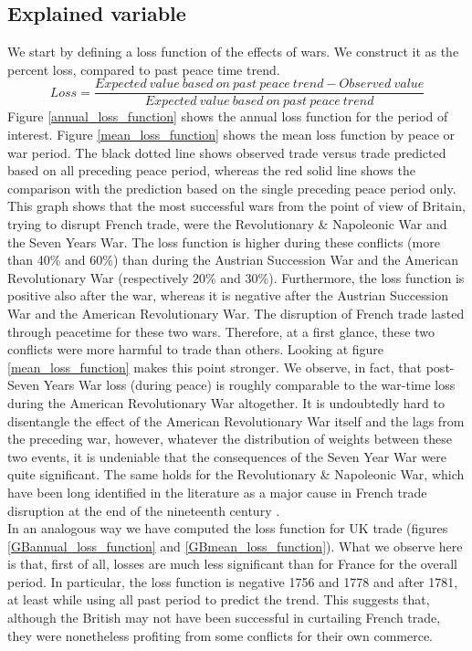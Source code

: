 \documentclass[12pt,a4paper,notitlepage,english]{article}
\begin{document}
\subsection{Explained variable}
We start by defining a loss function of the effects of wars.
We construct it as the percent loss, compared to past peace time trend.
\begin{equation*}
Loss = \frac{Expected \> value \> based \> on \>past \> peace \>trend - Observed \> value}{Expected \> value \> based \> on \>past \> peace \>trend}
\end{equation*}
Figure \ref{annual_loss_function} shows the annual loss function for the period of interest. Figure \ref{mean_loss_function} shows the mean loss function by peace or war period.
The black dotted line shows observed trade versus trade predicted based on all preceding peace period, whereas the red solid line shows the comparison with the prediction based on the single preceding peace period only.
This graph shows that the most successful wars from the point of view of Britain, trying to disrupt French trade, were the Revolutionary \& Napoleonic War and the Seven Years War.
The loss function is higher during these conflicts (more than 40\% and 60\%) than during the Austrian Succession War and the American Revolutionary War (respectively 20\% and 30\%).
Furthermore, the loss function is positive also after the war, whereas it is negative after the Austrian Succession War and the American Revolutionary War. The disruption of French trade lasted through peacetime for these two wars. 
Therefore, at a first glance, these two conflicts were more harmful to trade than others.
Looking at figure \ref{mean_loss_function} makes this point stronger.
We observe, in fact, that post-Seven Years War loss (during peace) is roughly comparable to the war-time loss during the American Revolutionary War altogether.
It is undoubtedly hard to disentangle the effect of the American Revolutionary War itself and the lags from the preceding war, however, whatever the distribution of weights between these two events, it is undeniable that the consequences of the Seven Year War were quite significant.
The same holds for the Revolutionary \& Napoleonic War, which have been long identified in the literature as a major cause in French trade disruption at the end of the nineteenth century \citep{ORourke2006}. \\
In an analogous way we have computed the loss function for UK trade (figures \ref{GBannual_loss_function} and \ref{GBmean_loss_function}). What we observe here is that, first of all, losses are much less significant than for France for the overall period. In particular, the loss function is negative 1756 and 1778 and after 1781, at least while using all past period to predict the trend. This suggests that, although the British may not have been successful in curtailing French trade, they were nonetheless profiting from some conflicts for their own commerce. 
\end{document}

